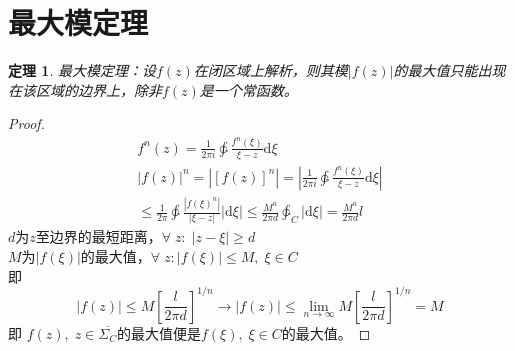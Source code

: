 \documentclass[10pt, a4paper, oneside]{ctexbook}
\newtheorem{theorem}{定理}[section]
\def\D{\mathrm{d}}
\newcommand{\F}[1][z]
{\ensuremath{f(#1)}}
\begin{document}
\section{最大模定理}
\begin{theorem}
    最大模定理：设$\F$在闭区域上解析，则其模$|\F|$的最大值只能出现在该区域的边界上，除非$\F$是一个常函数。
\end{theorem}
\begin{proof}
    \begin{align*}
        f^n(z)=\frac{1}{2\pi i} \ointctrclockwise \frac{f^n(\xi)}{\xi-z}\D \xi\\
        |\F|^n=|\left[\F\right]^n|=\left|\frac{1}{2\pi i} \ointctrclockwise \frac{f^n(\xi)}{\xi-z}\D \xi\right| \\ \le \frac{1}{2\pi} \ointctrclockwise \frac{|f(\xi)^n|}{|\xi-z|}|\D \xi|
        \le \frac{M^n}{2\pi d}\ointctrclockwise_C |\D \xi|=\frac{M^n}{2\pi d}l
    \end{align*}
    $d$为$z$至边界的最短距离，$\forall\; z:\;|z-\xi|\ge d$\\
    $M$为$|\F[\xi]|$的最大值，$\forall\; z:|f(\xi)|\le M,\;\xi\in C$\\
    即
    $$
    |\F|\le M\left[\frac{l}{2\pi d}\right]^{1/n}\to|\F|\le \lim_{n\to \infty} M\left[\frac{l}{2\pi d}\right]^{1/n}=M
    $$
    即
    $f(z),\;z\in \overline{\Sigma_C}$的最大值便是$f(\xi),\;\xi\in C$的最大值。
\end{proof}
\end{document}
